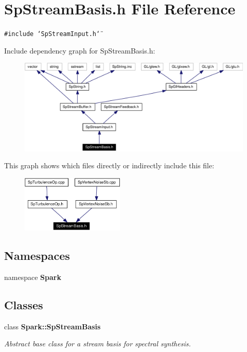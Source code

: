 \section{Sp\-Stream\-Basis.h File Reference}
\label{SpStreamBasis_8h}
{\tt \#include \char`\"{}Sp\-Stream\-Input.h\char`\"{}}\par


Include dependency graph for Sp\-Stream\-Basis.h:\begin{figure}[H]
\begin{center}
\leavevmode
\includegraphics[width=321pt]{SpStreamBasis_8h__incl}
\end{center}
\end{figure}


This graph shows which files directly or indirectly include this file:\begin{figure}[H]
\begin{center}
\leavevmode
\includegraphics[width=139pt]{SpStreamBasis_8h__dep__incl}
\end{center}
\end{figure}
\subsection*{Namespaces}
\begin{CompactItemize}
\item 
namespace {\bf Spark}
\end{CompactItemize}
\subsection*{Classes}
\begin{CompactItemize}
\item 
class {\bf Spark::Sp\-Stream\-Basis}
\begin{CompactList}\small\item\em Abstract base class for a stream basis for spectral synthesis. \item\end{CompactList}\end{CompactItemize}
